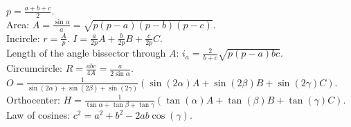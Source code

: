 \documentclass[landscape,a4paper,twocolumn,10pt]{report}
\begin{document}
$p=\frac{a+b+c}{2}$.\\
Area: $A=\frac{\sin\alpha}{a}=\sqrt{p(p-a)(p-b)(p-c)}$.\\
Incircle: $r=\frac{A}{p}$. $I=\frac{a}{2p}A+\frac{b}{2p}B+\frac{c}{2p}C$.\\
Length of the angle bissector through $A$: $i_a=\frac{2}{b+c}\sqrt{p(p-a)bc}$.\\
Circumcircle: $R=\frac{abc}{4A}=\frac{a}{2\sin\alpha}$. $O=\frac{1}{\sin(2\alpha)+\sin(2\beta)+\sin(2\gamma)}(\sin(2\alpha)A+\sin(2\beta)B+\sin(2\gamma)C)$.\\
Orthocenter: $H=\frac{1}{\tan\alpha+\tan\beta+\tan\gamma}(\tan(\alpha)A+\tan(\beta)B+\tan(\gamma)C)$.\\
Law of cosines: $c^2=a^2+b^2-2ab\cos(\gamma)$.
\end{document}
